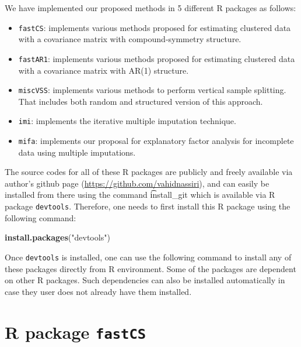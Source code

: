 \documentclass[11pt,a5paper,twoside]{book}
\newenvironment{Shaded}{\begin{snugshade}}{\end{snugshade}}
\newcommand{\KeywordTok}[1]{\textcolor[rgb]{0.13,0.29,0.53}{\textbf{#1}}}
\newcommand{\NormalTok}[1]{#1}
\newcommand{\StringTok}[1]{\textcolor[rgb]{0.31,0.60,0.02}{#1}}
\begin{document}
We have implemented our proposed methods in 5 different R packages as follows:

\begin{itemize}
\item {\tt{fastCS}}: implements various methods proposed for estimating clustered data with a covariance matrix with compound-symmetry structure.

\item {\tt{fastAR1}}: implements various methods proposed for estimating clustered data with a covariance matrix with AR(1) structure.

\item {\tt{miscVSS}}: implements various methods to perform vertical sample splitting. That includes both random and structured version of this approach.

\item {\tt{imi}}: implements the iterative multiple imputation technique.

\item {\tt{mifa}}: implements our proposal for explanatory factor analysis for incomplete data using multiple imputations.

\end{itemize}

The source codes for all of these R packages are publicly and freely available via author's github page (\url{https://github.com/vahidnassiri}), and can easily be installed from there using the command {\t{install\_git}} which is available via R package {\tt{devtools}}. Therefore, one needs to first install this R package using the following command:

\begin{Shaded}
\begin{Highlighting}[]
\KeywordTok{install.packages}\NormalTok{(}\StringTok{"devtools"}\NormalTok{)}
\end{Highlighting}
\end{Shaded}

Once {\tt{devtools}} is installed, one can use the following command to install any of these packages directly from R environment. Some of the packages are dependent on other R packages. Such dependencies can also be installed automatically in case they user does not already have them installed. 




\section{R package {\tt{fastCS}}}
\end{document}
